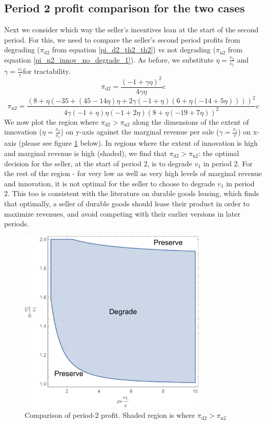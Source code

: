 \documentclass[isre,blindrev]{informs3} %
\begin{document}
\subsection{Period 2 profit comparison for the two cases}
\label{innovate-compare-period-2}

Next we consider which way the seller{'}s incentives lean at the start of the second period. For this, we need to compare the seller{'}s second period
profits from degrading (\(\pi _{\text{d2}}\) from equation \ref{pi_d2_th2_th2}) vs not degrading (\(\pi _{\text{n2}}\) from equation \ref{pi_n2_innov_no_degrade_1}). As before, we substitute
\(\eta  =\frac{v_2}{v_1}\) and \(\gamma =\frac{v_1}{c}\)for tractability.
\begin{equation}\label{pi_d2}
\pi _{\text{d2}}=\frac{ (-1+\gamma  \eta )^2}{4 \gamma  \eta }c
\end{equation}
\begin{equation}\label{pi_n2}
\pi _{\text{n2}}=\frac{(8+\eta  (-35+(45-14 \eta ) \eta +2 \gamma  (-1+\eta ) (6+\eta  (-14+5 \eta ))))^2}{4 \gamma  (-1+\eta ) \eta  (-1+2 \eta
) (8+\eta  (-19+7 \eta ))^2}c
\end{equation}
We now plot the region where \(\pi _{\text{d2}}>\pi _{\text{n2}}\) along the dimensions of the extent of innovation (\(\eta =\frac{v_2}{v_1}\)) on
y-axis against the marginal revenue per sale (\(\gamma =\frac{v_1}{c}\)) on x-axis (please see figure \ref{fig:fig5} below). In regions where the extent
of innovation is high and marginal revenue is high (shaded), we find that \(\pi _{\text{d2}}>\pi _{\text{n2}}\): the optimal decision for the seller,
at the start of period 2, is to degrade \(v_1\) in period 2. For the rest of the region - for very low as well as very high levels of marginal revenue
and innovation, it is not optimal for the seller to choose to degrade \(v_1\) in period 2. This too is consistent with the literature on durable
goods leasing, which finds that optimally, a seller of durable goods should lease their product in order to maximize revenues, and avoid competing
with their earlier versions in later periods.

\begin{figure}[htp]
    \centering
    \includegraphics[width=9cm]{2020_05_19-overleaf-mirror_gr5.pdf}
    \caption{Comparison of period-2 profit. Shaded region is where \(\pi _{\text{d2}}>\pi _{\text{n2}}\)}
    \label{fig:fig5}
\end{figure}
\end{document}
